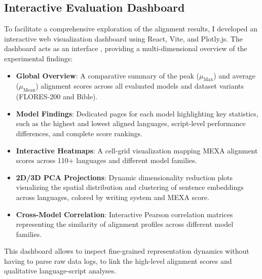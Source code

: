 \documentclass{article}
\begin{document}
\subsection{Interactive Evaluation Dashboard}
\label{subsec:dashboard}

To facilitate a comprehensive exploration of the alignment results, I developed an interactive web visualization dashboard using React, Vite, and Plotly.js. The dashboard acts as an interface , providing a multi-dimensional overview of the experimental findings:

\begin{itemize}
    \item \textbf{Global Overview}: A comparative summary of the peak ($\mu_{\text{Max}}$) and average ($\mu_{\text{Mean}}$) alignment scores across all evaluated models and dataset variants (FLORES-200 and Bible).
    \item \textbf{Model Findings}: Dedicated pages for each model highlighting key statistics, such as the highest and lowest aligned languages, script-level performance differences, and complete score rankings.
    \item \textbf{Interactive Heatmaps}: A cell-grid visualization mapping MEXA alignment scores across 110+ languages and different model families.
    \item \textbf{2D/3D PCA Projections}: Dynamic dimensionality reduction plots visualizing the spatial distribution and clustering of sentence embeddings across languages, colored by writing system and MEXA score.
    \item \textbf{Cross-Model Correlation}: Interactive Pearson correlation matrices representing the similarity of alignment profiles across different model families.
\end{itemize}

This dashboard allows  to inspect fine-grained representation dynamics without having to parse raw data logs, to link the high-level alignment scores and qualitative language-script analyses.





\end{document}
